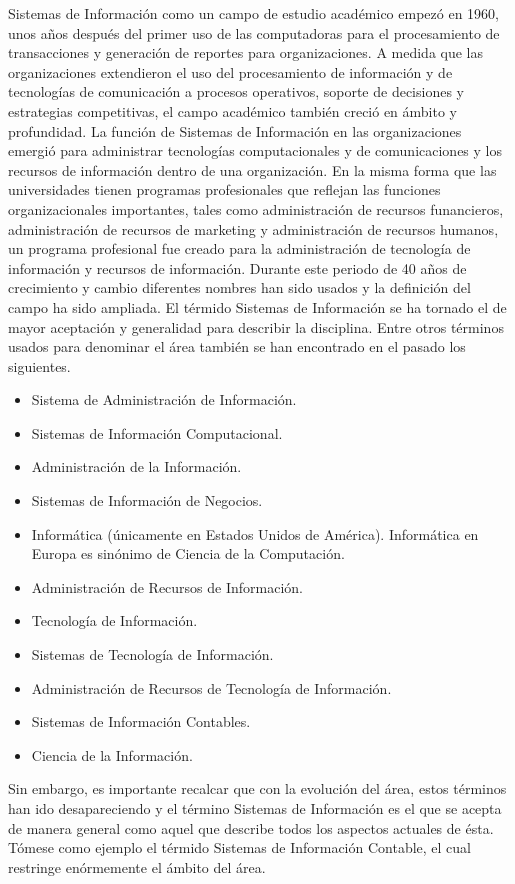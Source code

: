 Sistemas de Información como un campo de estudio académico empezó en 1960, unos años después del primer uso de las
computadoras para el procesamiento de transacciones y generación de reportes para organizaciones. A medida que las
organizaciones extendieron el uso del procesamiento de información y de tecnologías de comunicación a procesos
operativos, soporte de decisiones y estrategias competitivas, el campo académico también creció en ámbito y profundidad.
La función de Sistemas de Información en las organizaciones emergió para administrar tecnologías computacionales y de
comunicaciones y los recursos de información dentro de una organización. En la misma forma que las universidades tienen
programas profesionales que reflejan las funciones organizacionales importantes, tales como administración de recursos
funancieros, administración de recursos de marketing y administración de recursos humanos, un programa profesional fue
creado para la administración de tecnología de información y recursos de información. Durante este periodo de 40 años de
crecimiento y cambio diferentes nombres han sido usados y la definición del campo ha sido ampliada. El térmido Sistemas
de Información se ha tornado el de mayor aceptación y generalidad para describir la disciplina. Entre otros términos
usados para denominar el área también se han encontrado en el pasado los siguientes.

\begin{itemize}
\item Sistema de Administración de Información.
\item Sistemas de Información Computacional.
\item Administración de la Información.
\item Sistemas de Información de Negocios.
\item Informática (únicamente en Estados Unidos de América). Informática en Europa es sinónimo de Ciencia de la
Computación.
\item Administración de Recursos de Información.
\item Tecnología de Información.
\item Sistemas de Tecnología de Información.
\item Administración de Recursos de Tecnología de Información.
\item Sistemas de Información Contables.
\item Ciencia de la Información.
\end{itemize}
 
Sin embargo, es importante recalcar que con la evolución del área, estos términos han ido desapareciendo y el término
Sistemas de Información es el que se acepta de manera general como aquel que describe todos los aspectos actuales de ésta. 
Tómese como ejemplo el térmido Sistemas de Información Contable, el cual restringe enórmemente el ámbito del área.
 

